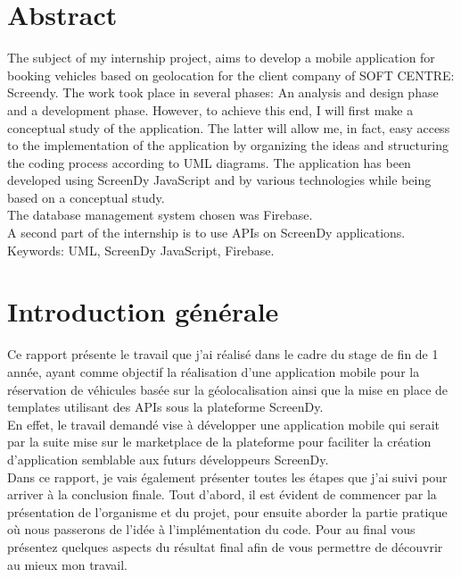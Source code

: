 \documentclass[12pt,a4paper]{report}
\begin{document}
	\chapter*{Abstract}
	The subject of my internship project, aims to develop a mobile application for booking vehicles based on geolocation for the client company of SOFT CENTRE: Screendy. The work took place in several phases: An analysis and design phase and a development phase.
However, to achieve this end, I will first make a conceptual study of the application. The latter will allow me, in fact, easy access to the implementation of the application by organizing the ideas and structuring the coding process according to UML diagrams. The application has been developed using \guillemotleft ScreenDy JavaScript \guillemotright and by various technologies while being based on a conceptual study. \\
The database management system chosen was Firebase.\\
A second part of the internship is to use APIs on ScreenDy applications.\\
Keywords: UML, ScreenDy JavaScript, Firebase. 


	\listoffigures
	\tableofcontents

	\chapter*{Introduction générale}
	Ce rapport présente le travail que j'ai réalisé dans le cadre du stage de fin de 1 ann\'ee, ayant comme objectif la réalisation d'une application mobile pour la réservation de véhicules basée sur la géolocalisation ainsi que la mise en place de templates utilisant des APIs sous la plateforme ScreenDy.\\
	En effet, le travail demandé vise à développer une application mobile qui serait par la suite mise sur le marketplace de la plateforme pour faciliter la création d'application semblable aux futurs développeurs ScreenDy.\\
	Dans ce rapport, je vais également présenter toutes les étapes que j'ai suivi pour arriver à la conclusion finale. Tout d'abord, il est évident de commencer par la présentation de l'organisme et du projet, pour ensuite aborder la partie pratique où nous passerons de l’idée à l’implémentation du code. Pour au final vous présentez quelques aspects du résultat final afin de vous permettre de découvrir au mieux mon travail.\\
	
\end{document}
